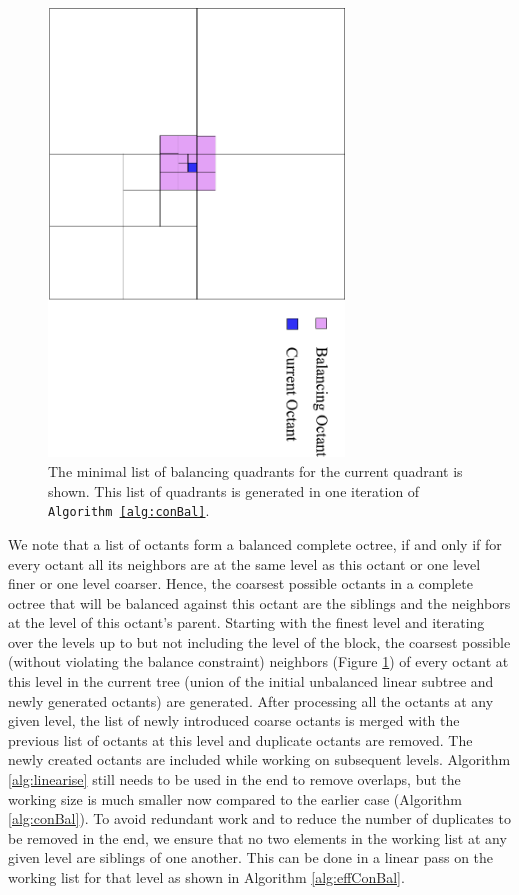 \begin{figure}
  \centering
  \includegraphics[angle=90,width=0.7\textwidth]{images/indBalNh}
  \caption{The minimal list of balancing quadrants for the current quadrant is shown. This list of quadrants is generated in one iteration of {\tt Algorithm \ref{alg:conBal}}.}
  \label{fig:indBalNh}
\end{figure}

We note that a list of octants form a balanced complete octree, if and only if for every octant all its neighbors are at the same level as this octant or one level finer or one level coarser. Hence, the coarsest possible octants in a complete octree that will be balanced against this octant are the siblings and the neighbors at the level of this octant's parent. Starting with the finest level and iterating over the levels up to but not including the level of the block, the coarsest possible (without violating the balance constraint) neighbors (Figure \ref{fig:indBalNh}) of every octant at this level in the current tree (union of the initial unbalanced linear subtree and newly generated octants) are generated. After processing all the octants at any given level, the list of newly introduced coarse octants is merged with the previous list of octants at this level and duplicate octants are removed. The newly created octants are included while working on subsequent levels. Algorithm \ref{alg:linearise} still needs to be used in the end to remove overlaps, but the working size is much smaller now compared to the earlier case (Algorithm \ref{alg:conBal}). To avoid redundant work and to reduce the number of duplicates to be removed in the end, we ensure that no two elements in the working list at any given level are siblings of one another. This can be done in a linear pass on the working list for that level as shown in Algorithm \ref{alg:effConBal}.

